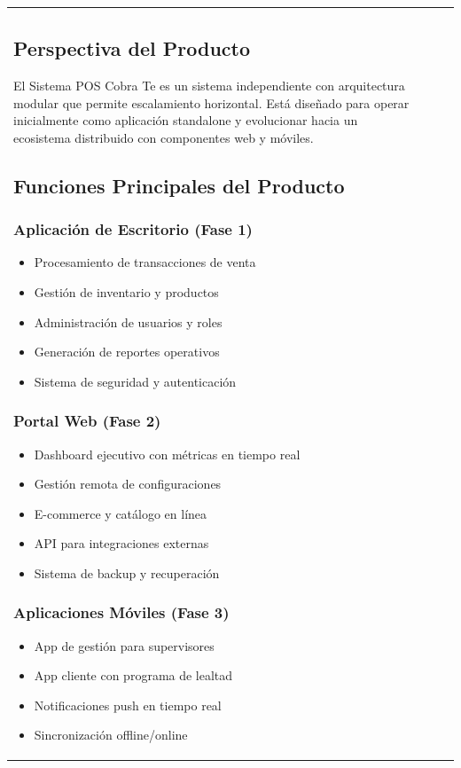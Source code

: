 \documentclass[12pt,letterpaper]{article}
\begin{document}
\begin{longtable}{|p{3cm}|p{2cm}|p{4cm}|p{6cm}|}
\subsection{Perspectiva del Producto}
El Sistema POS Cobra Te es un sistema independiente con arquitectura modular que permite escalamiento horizontal. Está diseñado para operar inicialmente como aplicación standalone y evolucionar hacia un ecosistema distribuido con componentes web y móviles.

\subsection{Funciones Principales del Producto}

\subsubsection{Aplicación de Escritorio (Fase 1)}
\begin{itemize}
    \item Procesamiento de transacciones de venta
    \item Gestión de inventario y productos
    \item Administración de usuarios y roles
    \item Generación de reportes operativos
    \item Sistema de seguridad y autenticación
\end{itemize}

\subsubsection{Portal Web (Fase 2)}
\begin{itemize}
    \item Dashboard ejecutivo con métricas en tiempo real
    \item Gestión remota de configuraciones
    \item E-commerce y catálogo en línea
    \item API para integraciones externas
    \item Sistema de backup y recuperación
\end{itemize}

\subsubsection{Aplicaciones Móviles (Fase 3)}
\begin{itemize}
    \item App de gestión para supervisores
    \item App cliente con programa de lealtad
    \item Notificaciones push en tiempo real
    \item Sincronización offline/online
\end{itemize}


\end{longtable}
\end{document}

